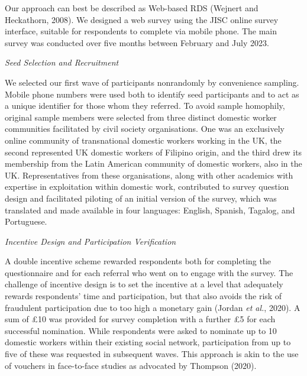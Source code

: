 \documentclass[
  12pt,
  letterpaper,
  DIV=11,
  numbers=noendperiod]{scrartcl}
\begin{document}
Our approach can best be described as Web-based RDS (Wejnert and
Heckathorn, 2008). We designed a web survey using the JISC online survey
interface, suitable for respondents to complete via mobile phone. The
main survey was conducted over five months between February and July
2023.

\emph{Seed Selection and Recruitment}

We selected our first wave of participants nonrandomly by convenience
sampling. Mobile phone numbers were used both to identify seed
participants and to act as a unique identifier for those whom they
referred. To avoid sample homophily, original sample members were
selected from three distinct domestic worker communities facilitated by
civil society organisations. One was an exclusively online community of
transnational domestic workers working in the UK, the second represented
UK domestic workers of Filipino origin, and the third drew its
membership from the Latin American community of domestic workers, also
in the UK. Representatives from these organisations, along with other
academics with expertise in exploitation within domestic work,
contributed to survey question design and facilitated piloting of an
initial version of the survey, which was translated and made available
in four languages: English, Spanish, Tagalog, and Portuguese.

\emph{Incentive Design and Participation Verification}

A double incentive scheme rewarded respondents both for completing the
questionnaire and for each referral who went on to engage with the
survey. The challenge of incentive design is to set the incentive at a
level that adequately rewards respondents' time and participation, but
that also avoids the risk of fraudulent participation due to too high a
monetary gain (Jordan \emph{et al.}, 2020). A sum of £10 was provided
for survey completion with a further £5 for each successful nomination.
While respondents were asked to nominate up to 10 domestic workers
within their existing social network, participation from up to five of
these was requested in subsequent waves. This approach is akin to the
use of vouchers in face-to-face studies as advocated by Thompson (2020).
\end{document}
